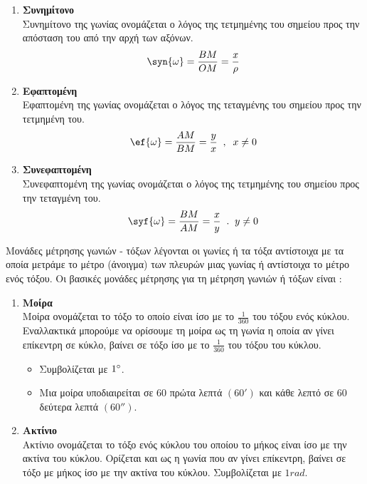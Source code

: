 \documentclass[twoside,nofonts,internet,shmeiwseis]{thewria}
\begin{document}
\begin{enumerate}[itemsep=0mm,label=\bf\arabic*.,start=2]
\item \textbf{Συνημίτονο}\\
Συνημίτονο της γωνίας  ονομάζεται ο λόγος της τετμημένης του σημείου προς την απόσταση του από την αρχή των αξόνων.
\[ \syn{\omega}=\frac{BM}{OM}=\frac{x}{\rho} \]
\item \textbf{Εφαπτομένη}\\
Εφαπτομένη της γωνίας ονομάζεται ο λόγος της τεταγμένης του σημείου προς την τετμημένη του.
\[ \ef{\omega}=\frac{AM}{BM}=\frac{y}{x}\;\;,\;\;x\neq0 \]
\item \textbf{Συνεφαπτομένη}\\
Συνεφαπτομένη της γωνίας  ονομάζεται ο λόγος της τετμημένης του σημείου προς την τεταγμένη του.
\[ \syf{\omega}=\frac{BM}{AM}=\frac{x}{y}\;\;.\;\;y\neq0 \]
\end{enumerate}
Μονάδες μέτρησης γωνιών - τόξων λέγονται οι γωνίες ή τα τόξα αντίστοιχα με τα οποία μετράμε το μέτρο (άνοιγμα) των πλευρών μιας γωνίας ή αντίστοιχα το μέτρο ενός τόξου.
Οι βασικές μονάδες μέτρησης για τη μέτρηση γωνιών ή τόξων είναι :
\begin{enumerate}[itemsep=0mm,label=\bf\arabic*.]
\item \textbf{Μοίρα}\\
Μοίρα ονομάζεται το τόξο το οποίο είναι ίσο με το $ \frac{1}{360} $ του τόξου ενός κύκλου.
Εναλλακτικά μπορούμε να ορίσουμε τη μοίρα ως τη γωνία η οποία αν γίνει επίκεντρη σε κύκλο, βαίνει σε τόξο ίσο με το $ \frac{1}{360} $ του τόξου του κύκλου.
\begin{itemize}[itemsep=0mm]
\item Συμβολίζεται με $ 1\degree $.
\item Μια μοίρα υποδιαιρείται σε 60 πρώτα λεπτά $ (60') $ και κάθε λεπτό σε 60 δεύτερα λεπτά $ (60'') $.
\end{itemize}
\item \textbf{Ακτίνιο}\\
Ακτίνιο ονομάζεται το τόξο ενός κύκλου του οποίου το μήκος είναι ίσο με την ακτίνα του κύκλου. Ορίζεται και ως η γωνία που αν γίνει επίκεντρη, βαίνει σε τόξο με μήκος ίσο με την ακτίνα του κύκλου.
Συμβολίζεται με $ 1rad $.
\end{enumerate}
\end{document}
